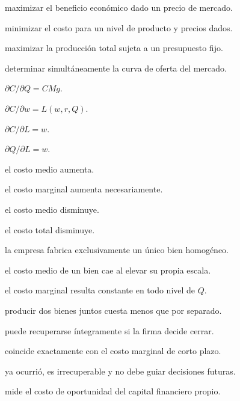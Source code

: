 \begin{opts}
    \item maximizar el beneficio económico dado un precio de mercado.
    \item minimizar el costo para un nivel de producto y precios dados.
    \item maximizar la producción total sujeta a un presupuesto fijo.
    \item determinar simultáneamente la curva de oferta del mercado.
\end{opts}

\begin{opts}
    \item $\partial C/\partial Q=CMg$.
    \item $\partial C/\partial w=L(w,r,Q)$.
    \item $\partial C/\partial L=w$.
    \item $\partial Q/\partial L=w$.
\end{opts}

\begin{opts}
    \item el costo medio aumenta.
    \item el costo marginal aumenta necesariamente.
    \item el costo medio disminuye.
    \item el costo total disminuye.
\end{opts}

\begin{opts}
    \item la empresa fabrica exclusivamente un único bien homogéneo.
    \item el costo medio de un bien cae al elevar su propia escala.
    \item el costo marginal resulta constante en todo nivel de $Q$.
    \item producir dos bienes juntos cuesta menos que por separado.
\end{opts}

\begin{opts}
    \item puede recuperarse íntegramente si la firma decide cerrar.
    \item coincide exactamente con el costo marginal de corto plazo.
    \item ya ocurrió, es irrecuperable y no debe guiar decisiones futuras.
    \item mide el costo de oportunidad del capital financiero propio.
\end{opts}

